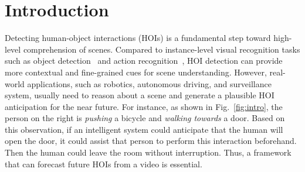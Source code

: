 \documentclass[times,twocolumn,final,authoryear]{elsarticle}
\begin{document}
\section{Introduction}

Detecting human-object interactions (HOIs) is a fundamental step toward high-level comprehension of scenes. Compared to instance-level visual recognition tasks such as object detection~\citep{detection:faster_rcnn, detection:detr, detection:yolov5} and action recognition~\citep{action:two_stream, action:kinetics}, HOI detection can provide more contextual and fine-grained cues for scene understanding. However, real-world applications, such as robotics, autonomous driving, and surveillance system, usually need to reason about a scene and generate a plausible HOI anticipation for the near future. For instance, as shown in Fig.~\ref{fig:intro}, the person on the right is \emph{pushing} a bicycle and \emph{walking towards} a door. Based on this observation, if an intelligent system could anticipate that the human will open the door, it could assist that person to perform this interaction beforehand. Then the human could leave the room without interruption. Thus, a framework that can forecast future HOIs from a video is essential. 
\end{document}
